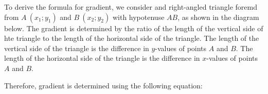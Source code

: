 \setcounter{subfigure}{0}
\begin{figure}[H] %
\begin{center}
\end{center}
\end{figure}        
To derive the formula for gradient, we consider and right-angled triangle foremd from $A~(x_1;y_1)$ and $B~(x_2;y_2)$ with hypotenuse $AB$, as shown in the diagram below. The gradient is determined by the ratio of the length of the vertical side of hte triangle to the length of the horizontal side of the triangle. The length of the vertical side of the triangle is the difference in $y$-values of points $A$ and $B$. The length of the horizontal side of the triangle is the difference in $x$-values of points $A$ and $B$. 
\setcounter{subfigure}{0}
\begin{figure}[H] %
\begin{center}
\end{center}
\end{figure}  
Therefore, gradient is determined using the following equation:


